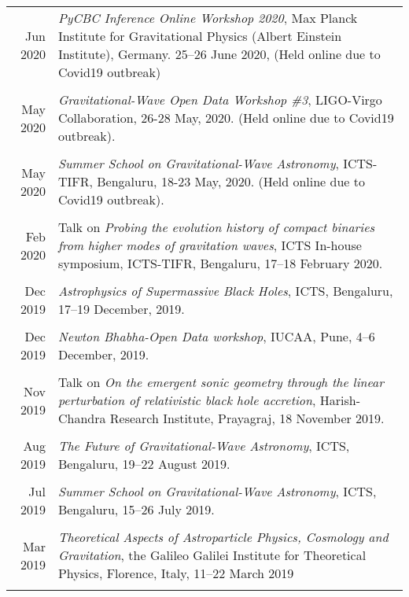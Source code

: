 \documentclass[10pt]{article}
\begin{document}
\begin{longtable}{rp{14cm}}
  Jun 2020 & {\itshape PyCBC Inference Online Workshop 2020}, Max Planck Institute for Gravitational Physics (Albert Einstein Institute), Germany. 25--26 June 2020, (Held online due to Covid19 outbreak)\\\\
  
  May 2020 & {\itshape Gravitational-Wave Open Data Workshop \#3}, LIGO-Virgo Collaboration, 26-28 May, 2020. (Held online due to Covid19 outbreak).\\\\
  
  May 2020 & {\itshape Summer School on Gravitational-Wave Astronomy}, ICTS-TIFR, Bengaluru, 18-23 May, 2020. (Held online due to Covid19 outbreak).\\\\
  
Feb 2020 & {Talk} on {\itshape Probing the evolution history of compact binaries from higher modes of gravitation waves}, ICTS In-house symposium, ICTS-TIFR, Bengaluru, 17--18 February 2020.\\\\ %

 Dec 2019 & {\itshape Astrophysics of Supermassive Black Holes}, ICTS, Bengaluru, 17--19 December, 2019.\\\\

 Dec 2019 & {\itshape Newton Bhabha-Open Data workshop}, IUCAA, Pune, 4--6 December, 2019.\\\\
  
 Nov 2019 & {Talk} on {\itshape On the emergent sonic geometry through the linear perturbation of relativistic black hole accretion}, Harish-Chandra Research Institute, Prayagraj, 18 November 2019.\\\\

Aug 2019 & {\itshape The Future of Gravitational-Wave Astronomy}, ICTS, Bengaluru, 19--22 August 2019.\\\\

Jul 2019 & {\itshape Summer School on Gravitational-Wave Astronomy}, ICTS, Bengaluru, 15--26 July 2019.\\\\

Mar 2019 & {\itshape Theoretical Aspects of Astroparticle Physics, Cosmology and Gravitation}, the Galileo Galilei Institute for Theoretical Physics, Florence, Italy, 11--22 March 2019\\\\
  

\end{longtable}
\end{document}
